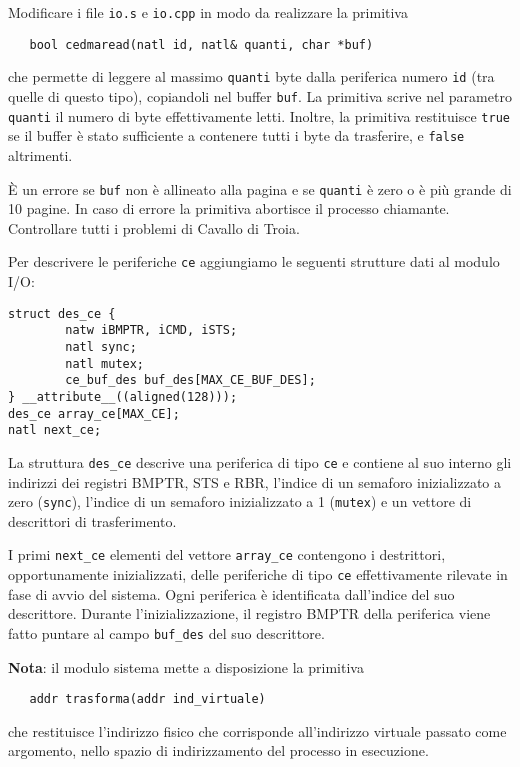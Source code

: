 Modificare i file \verb|io.s| e \verb|io.cpp| in modo da realizzare la primitiva
\begin{verbatim}
   bool cedmaread(natl id, natl& quanti, char *buf)
\end{verbatim}
che permette di leggere al massimo \verb|quanti| byte dalla periferica numero \verb|id| (tra quelle di questo tipo), copiandoli
nel buffer \verb|buf|. La primitiva scrive nel parametro \verb|quanti|
il numero di byte effettivamente letti. Inoltre, la primitiva restituisce
\verb|true| se il buffer \`e stato sufficiente a contenere tutti i byte
da trasferire, e \verb|false| altrimenti.

\`E un errore se \verb|buf| non \`e allineato alla pagina e se \verb|quanti| \`e zero o \`e pi\`u grande di 10 pagine. In caso di errore la primitiva
abortisce il processo chiamante. Controllare tutti i problemi di Cavallo di Troia.

Per descrivere le periferiche \verb|ce| aggiungiamo le seguenti strutture dati al modulo I/O:
\begin{verbatim}
struct des_ce {
        natw iBMPTR, iCMD, iSTS;
        natl sync;
        natl mutex;
        ce_buf_des buf_des[MAX_CE_BUF_DES];
} __attribute__((aligned(128)));
des_ce array_ce[MAX_CE];
natl next_ce;
\end{verbatim}
La struttura \verb|des_ce| descrive una periferica di tipo \verb|ce| e contiene al suo interno gli indirizzi
dei registri BMPTR, STS e RBR, l'indice di un semaforo inizializzato a zero (\verb|sync|), l'indice di un semaforo
inizializzato a 1 (\verb|mutex|) e un vettore di descrittori di trasferimento.

I primi \verb|next_ce| elementi del vettore \verb|array_ce| contengono i destrittori, opportunamente inizializzati,
delle periferiche di tipo \verb|ce| effettivamente rilevate in fase di avvio del sistema. Ogni periferica \`e identificata
dall'indice del suo descrittore.
Durante l'inizializzazione, il registro BMPTR della periferica viene
fatto puntare al campo \verb|buf_des| del suo descrittore.

{\bf Nota}: il modulo sistema mette a disposizione la primitiva 
\begin{verbatim}
   addr trasforma(addr ind_virtuale)
\end{verbatim}
che restituisce
l'indirizzo fisico che corrisponde all'indirizzo virtuale passato come argomento, nello spazio di indirizzamento del
processo in esecuzione.
